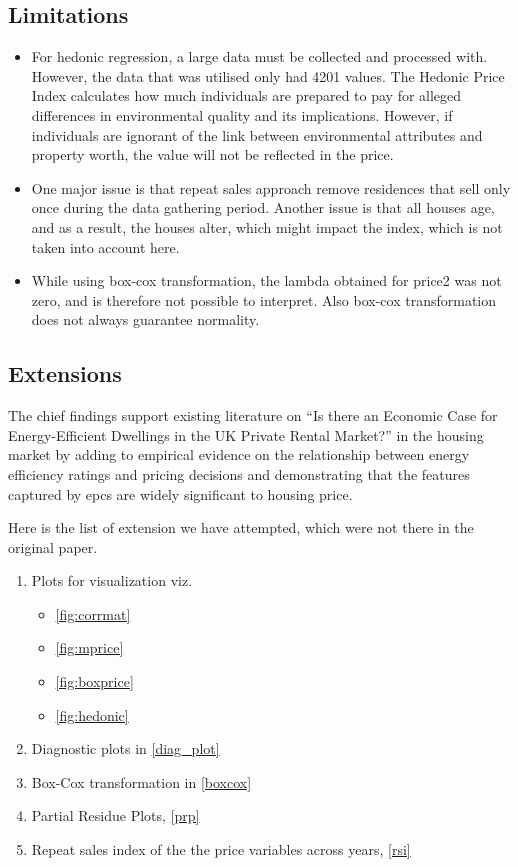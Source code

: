 \documentclass[12pt]{article}
\begin{document}
\subsection{Limitations}
\begin{itemize}
    \item For hedonic regression, a large  data must be collected and processed with. However, the data that was utilised only had 4201 values. The Hedonic Price Index calculates how much individuals are prepared to pay for alleged differences in environmental quality and its implications. However, if individuals are ignorant of the link between environmental attributes and property worth, the value will not be reflected in the price. 
    \item One major issue is that repeat sales approach remove residences that sell only once during the data gathering period. Another issue is that all houses age, and as a result, the houses alter, which might impact the index, which is not taken into account here.
    \item While using box-cox transformation, the lambda obtained for \gls{price2} was not zero, and is therefore not possible to interpret. Also box-cox transformation does not always guarantee normality.
\end{itemize}
\subsection{Extensions}
The chief findings support existing literature on “Is there an Economic Case for Energy-Efficient Dwellings in the UK Private Rental Market?” in the housing market by adding to empirical evidence on the relationship between energy efficiency ratings and pricing decisions and demonstrating that the features captured by \acrshort{epc}s are widely significant to housing price.

Here is the list of extension we have attempted, which were not there in the original paper.
\begin{enumerate}
    \item Plots for visualization viz.
    \begin{itemize}
        \item \autoref{fig:corrmat}
        \item \autoref{fig:mprice}
        \item \autoref{fig:boxprice}
        \item \autoref{fig:hedonic}
    \end{itemize}
    \item Diagnostic plots in \autoref{diag_plot}
    \item Box-Cox transformation in \autoref{boxcox}
    \item Partial Residue Plots, \autoref{prp}
    \item Repeat sales index of the the price variables across years, \autoref{rsi}
\end{enumerate}
\end{document}
